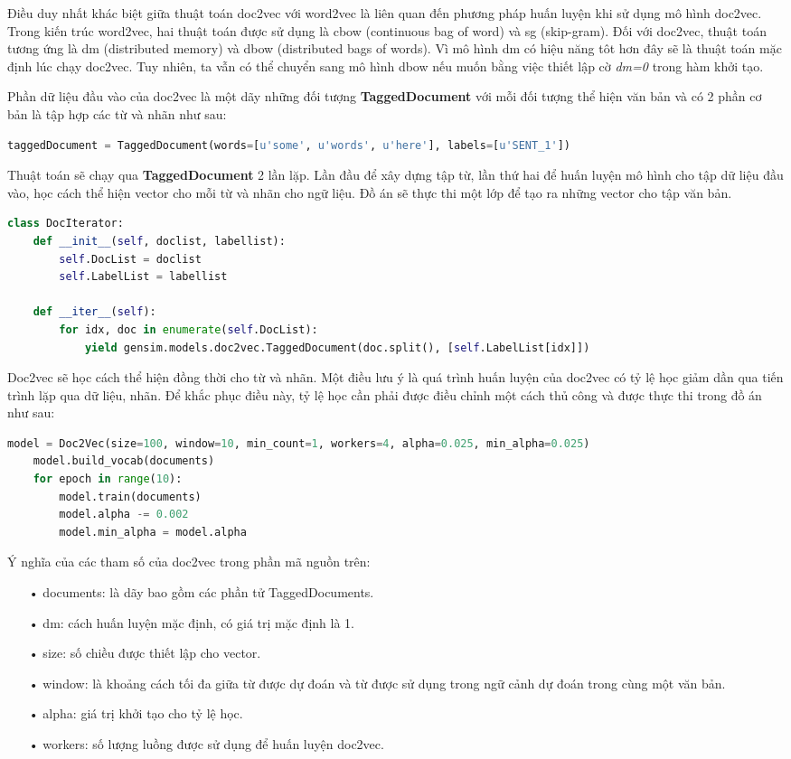 Điều duy nhất khác biệt giữa thuật toán doc2vec với word2vec là liên quan đến phương pháp huấn luyện khi sử dụng mô hình doc2vec.
Trong kiến trúc word2vec, hai thuật toán được sử dụng là cbow (continuous bag of word) và sg (skip-gram).
Đối với doc2vec, thuật toán tương ứng là dm (distributed memory) và dbow (distributed bags of words).
Vì mô hình dm có hiệu năng tôt hơn đây sẽ là thuật toán mặc định lúc chạy doc2vec.
Tuy nhiên, ta vẫn có thể chuyển sang mô hình dbow nếu muốn bằng việc thiết lập cờ \textit{dm=0} trong hàm khởi tạo.

Phần dữ liệu đầu vào của doc2vec là một dãy những đối tượng \textbf{TaggedDocument} với mỗi đối tượng thể hiện văn bản và có 2 phần cơ bản là tập hợp các từ và nhãn như sau:
\begin{lstlisting}[language=Python]
taggedDocument = TaggedDocument(words=[u'some', u'words', u'here'], labels=[u'SENT_1'])
\end{lstlisting}

Thuật toán sẽ chạy qua \textbf{TaggedDocument} 2 lần lặp.
Lần đầu để xây dựng tập từ, lần thứ hai để huấn luyện mô hình cho tập dữ liệu đầu vào, học cách thể hiện vector cho mỗi từ và nhãn cho ngữ liệu.
Đồ án sẽ thực thi một lớp để tạo ra những vector cho tập văn bản.
\begin{lstlisting}[language=Python]
class DocIterator:
    def __init__(self, doclist, labellist):
        self.DocList = doclist
        self.LabelList = labellist

    def __iter__(self):
        for idx, doc in enumerate(self.DocList):
            yield gensim.models.doc2vec.TaggedDocument(doc.split(), [self.LabelList[idx]])
\end{lstlisting}

Doc2vec sẽ học cách thể hiện đồng thời cho từ và nhãn.
Một điều lưu ý là quá trình huấn luyện của doc2vec có tỷ lệ học giảm dần qua tiến trình lặp qua dữ liệu, nhãn.
Để khắc phục điều này, tỷ lệ học cần phải được điều chỉnh một cách thủ công và được thực thi trong đồ án như sau:
\label{code:training}
\begin{lstlisting}[language=Python]
model = Doc2Vec(size=100, window=10, min_count=1, workers=4, alpha=0.025, min_alpha=0.025)
    model.build_vocab(documents)
    for epoch in range(10):
        model.train(documents)
        model.alpha -= 0.002
        model.min_alpha = model.alpha
\end{lstlisting}

Ý nghĩa của các tham số của doc2vec trong phần mã nguồn trên:
\begin{enumerate}
\item[•]documents: là dãy bao gồm các phần tử TaggedDocuments.
\item[•]dm: cách huấn luyện mặc định, có giá trị mặc định là 1.
\item[•]size: số chiều được thiết lập cho vector.
\item[•]window: là khoảng cách tối đa giữa từ được dự đoán và từ được sử dụng trong ngữ cảnh dự đoán trong cùng một văn bản.
\item[•]alpha: giá trị khởi tạo cho tỷ lệ học.
\item[•]workers:  số lượng luồng được sử dụng để huấn luyện doc2vec.
\end{enumerate}

